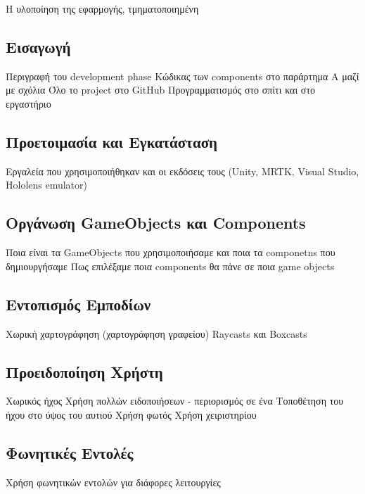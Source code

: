 Η υλοποίηση της εφαρμογής, τμηματοποιημένη

\subsection{Εισαγωγή}\label{subsec:developIntro}
Περιγραφή του development phase
Κώδικας των components στο παράρτημα Α μαζί με σχόλια
Όλο το project στο GitHub
Προγραμματισμός στο σπίτι και στο εργαστήριο

\subsection{Προετοιμασία και Εγκατάσταση}\label{subsec:developSetup}
Εργαλεία που χρησιμοποιήθηκαν και οι εκδόσεις τους (Unity, MRTK, Visual Studio, Hololens emulator)

\subsection{Οργάνωση GameObjects και Components}\label{subsec:developOrganization}
Ποια είναι τα GameObjects που χρησιμοποιήσαμε και ποια τα componetns που δημιουργήσαμε
Πως επιλέξαμε ποια components θα πάνε σε ποια game objects

\subsection{Εντοπισμός Εμποδίων}\label{subsec:developObstacleDetection}
Χωρική χαρτογράφηση (χαρτογράφηση γραφείου)
Raycasts και Boxcasts

\subsection{Προειδοποίηση Χρήστη}\label{subsec:developWarning}
Χωρικός ήχος
Χρήση πολλών ειδοποιήσεων - περιορισμός σε ένα
Τοποθέτηση του ήχου στο ύψος του αυτιού
Χρήση φωτός
Χρήση χειριστηρίου

\subsection{Φωνητικές Εντολές}\label{subsec:developVoiceCommands}
Χρήση φωνητικών εντολών για διάφορες λειτουργίες